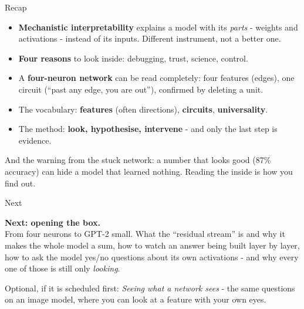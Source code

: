\documentclass[aspectratio=169]{beamer}
\newcommand{\trapbox}[1]{%
  \begin{tcolorbox}[colback=armred!8, colframe=armred, boxrule=0.6pt, arc=2pt]
  #1
  \end{tcolorbox}}
\newcommand{\takebox}[1]{%
  \begin{tcolorbox}[colback=paramgreen!8, colframe=paramgreen, boxrule=0.6pt, arc=2pt]
  #1
  \end{tcolorbox}}
\begin{document}
\begin{frame}{Recap}
  \vspace{0.4em}
  \begin{itemize}
    \item \textbf{Mechanistic interpretability} explains a model with its \emph{parts} - weights and
      activations - instead of its inputs. Different instrument, not a better one.
    \item \textbf{Four reasons} to look inside: debugging, trust, science, control.
    \item A \textbf{four-neuron network} can be read completely: four features (edges), one circuit
      (``past any edge, you are out''), confirmed by deleting a unit.
    \item The vocabulary: \textbf{features} (often directions), \textbf{circuits},
      \textbf{universality}.
    \item The method: \textbf{look, hypothesise, intervene} - and only the last step is evidence.
  \end{itemize}

  \vspace{0.6em}
  \trapbox{\small And the warning from the stuck network: a number that looks good (87\%
  accuracy) can hide a model that learned nothing. Reading the inside is how you find out.}
\end{frame}

\begin{frame}{Next}
  \vspace{1.2em}
  \takebox{\textbf{Next: opening the box.}\\[0.6em]
  From four neurons to GPT-2 small. What the ``residual stream'' is and why it makes the whole
  model a sum, how to watch an answer being built layer by layer, how to ask the model yes/no
  questions about its own activations - and why every one of those is still only
  \emph{looking}.}

  \vspace{1.0em}
  \begin{center}
    {\footnotesize Optional, if it is scheduled first: \emph{Seeing what a network sees} - the same
    questions on an image model, where you can look at a feature with your own eyes.}
  \end{center}
\end{frame}
\end{document}
